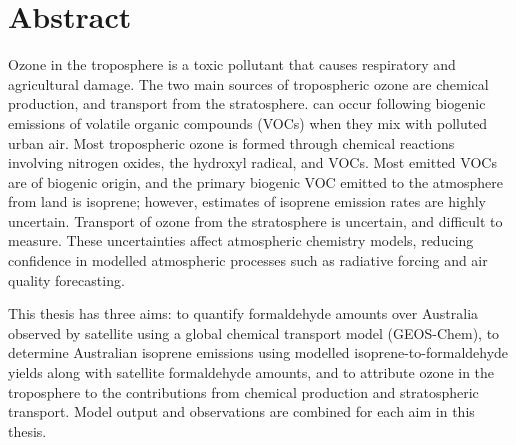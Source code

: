 

\chapter*{Abstract}
\setcounter{page}{5}


% 
\textbf{\ttitle} 
\newline
\newline

%
Ozone in the troposphere is a toxic pollutant that causes respiratory and agricultural damage. 
The two main sources of tropospheric ozone are chemical production, and transport from the stratosphere.
can occur following biogenic emissions of volatile organic compounds (VOCs) when they mix with polluted urban air.
Most tropospheric ozone is formed through chemical reactions involving nitrogen oxides, the hydroxyl radical, and VOCs.
Most emitted VOCs are of biogenic origin, and the primary biogenic VOC emitted to the atmosphere from land is isoprene; however, estimates of isoprene emission rates are highly uncertain.
Transport of ozone from the stratosphere is uncertain, and difficult to measure.
These uncertainties affect atmospheric chemistry models, reducing confidence in modelled atmospheric processes such as radiative forcing and air quality forecasting. 

This thesis has three aims: to quantify formaldehyde amounts over Australia observed by satellite using a global chemical transport model (GEOS-Chem), to determine Australian isoprene emissions using modelled isoprene-to-formaldehyde yields along with satellite formaldehyde amounts, and to attribute ozone in the troposphere to the contributions from chemical production and stratospheric transport. 
Model output and observations are combined for each aim in this thesis.



